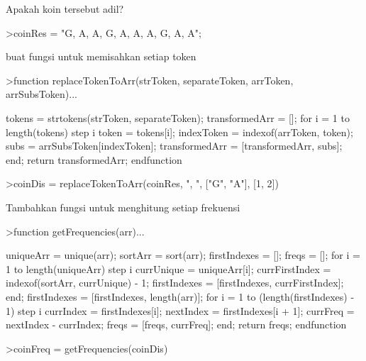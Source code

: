 \documentclass[a4paper,10pt]{article}
\begin{document}
\begin{eulernotebook}
\begin{eulercomment}
\begin{eulercomment}
\begin{eulercomment}
\begin{eulercomment}
\begin{eulercomment}
\begin{eulercomment}
\begin{eulercomment}
Apakah koin tersebut adil?
\end{eulercomment}
\begin{eulerprompt}
>coinRes = "G, A, A, G, A, A, A, G, A, A";
\end{eulerprompt}
\begin{eulercomment}
buat fungsi untuk memisahkan setiap token
\end{eulercomment}
\begin{eulerprompt}
>function replaceTokenToArr(strToken, separateToken, arrToken, arrSubsToken)...
\end{eulerprompt}
\begin{eulerudf}
  tokens = strtokens(strToken, separateToken);
  transformedArr = [];
  for i = 1 to length(tokens) step i
     token = tokens[i];
     indexToken = indexof(arrToken, token);
     subs = arrSubsToken[indexToken];
     transformedArr = [transformedArr, subs];
  end;
  return transformedArr;
  endfunction
\end{eulerudf}
\begin{eulerprompt}
>coinDis = replaceTokenToArr(coinRes, ", ", ["G", "A"], [1, 2])
\end{eulerprompt}
\begin{euleroutput}
  [1,  2,  2,  1,  2,  2,  2,  1,  2,  2]
\end{euleroutput}
\begin{eulercomment}
Tambahkan fungsi untuk menghitung setiap frekuensi
\end{eulercomment}
\begin{eulerprompt}
>function getFrequencies(arr)...
\end{eulerprompt}
\begin{eulerudf}
  uniqueArr = unique(arr);
  sortArr = sort(arr);
  firstIndexes = [];
  freqs = [];
  for i = 1 to length(uniqueArr) step i
     currUnique = uniqueArr[i];
     currFirstIndex = indexof(sortArr, currUnique) - 1;
     firstIndexes = [firstIndexes,  currFirstIndex];
  end;
  firstIndexes = [firstIndexes, length(arr)];
  for i = 1 to (length(firstIndexes) - 1) step i
     currIndex = firstIndexes[i];
     nextIndex = firstIndexes[i + 1];
     currFreq = nextIndex - currIndex;
     freqs = [freqs, currFreq];
  end;
  return freqs;
  endfunction
\end{eulerudf}
\begin{eulerprompt}
>coinFreq = getFrequencies(coinDis)
\end{eulerprompt}
\begin{euleroutput}
  [3,  7]
\end{euleroutput}

\end{eulercomment}
\end{eulercomment}
\end{eulercomment}
\end{eulercomment}
\end{eulercomment}
\end{eulercomment}
\end{eulernotebook}
\end{document}
